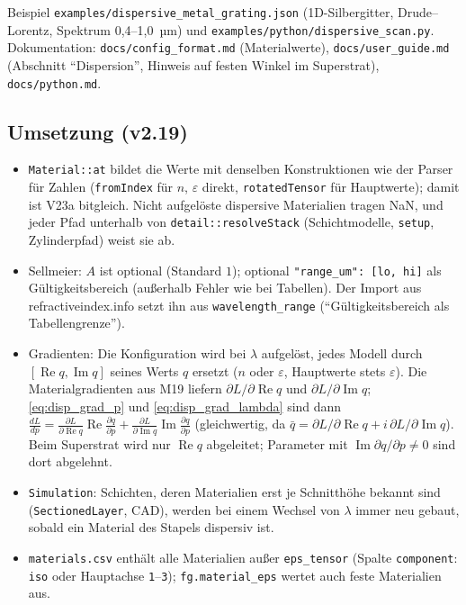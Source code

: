 Beispiel \verb|examples/dispersive_metal_grating.json| (1D-Silbergitter, Drude--Lorentz, Spektrum 0,4--1,0~µm) und
\verb|examples/python/dispersive_scan.py|. Dokumentation: \verb|docs/config_format.md| (Materialwerte),
\verb|docs/user_guide.md| (Abschnitt \enquote{Dispersion}, Hinweis auf festen Winkel im Superstrat),
\verb|docs/python.md|.

\subsection{Umsetzung (v2.19)}\label{sec:disp_impl}
\begin{itemize}[nosep]
  \item \verb|Material::at| bildet die Werte mit denselben Konstruktionen wie der Parser für Zahlen
        (\verb|fromIndex| für $n$, $\varepsilon$ direkt, \verb|rotatedTensor| für Hauptwerte); damit ist V23a bitgleich.
        Nicht aufgelöste dispersive Materialien tragen NaN, und jeder Pfad unterhalb von \verb|detail::resolveStack|
        (Schichtmodelle, \verb|setup|, Zylinderpfad) weist sie ab.
  \item Sellmeier: $A$ ist optional (Standard $1$); optional \verb|"range_um": [lo, hi]| als Gültigkeitsbereich
        (außerhalb Fehler wie bei Tabellen). Der Import aus refractiveindex.info setzt ihn aus
        \verb|wavelength_range| (\enquote{Gültigkeitsbereich als Tabellengrenze}).
  \item Gradienten: Die Konfiguration wird bei $\lambda$ aufgelöst, jedes Modell durch $[\operatorname{Re}q,
        \operatorname{Im}q]$ seines Werts $q$ ersetzt ($n$ oder $\varepsilon$, Hauptwerte stets $\varepsilon$). Die
        Materialgradienten aus M19 liefern $\partial L/\partial\operatorname{Re}q$ und $\partial L/\partial\operatorname{Im}q$;
        \eqref{eq:disp_grad_p} und \eqref{eq:disp_grad_lambda} sind dann
        $\frac{dL}{dp}=\frac{\partial L}{\partial\operatorname{Re}q}\operatorname{Re}\frac{\partial q}{\partial p}
        +\frac{\partial L}{\partial\operatorname{Im}q}\operatorname{Im}\frac{\partial q}{\partial p}$ (gleichwertig, da
        $\bar q=\partial L/\partial\operatorname{Re}q+i\,\partial L/\partial\operatorname{Im}q$). Beim Superstrat wird nur
        $\operatorname{Re}q$ abgeleitet; Parameter mit $\operatorname{Im}\partial q/\partial p\ne0$ sind dort abgelehnt.
  \item \verb|Simulation|: Schichten, deren Materialien erst je Schnitthöhe bekannt sind (\verb|SectionedLayer|, CAD),
        werden bei einem Wechsel von $\lambda$ immer neu gebaut, sobald ein Material des Stapels dispersiv ist.
  \item \verb|materials.csv| enthält alle Materialien außer \verb|eps_tensor| (Spalte \verb|component|: \verb|iso|
        oder Hauptachse \verb|1|--\verb|3|); \verb|fg.material_eps| wertet auch feste Materialien aus.
\end{itemize}

